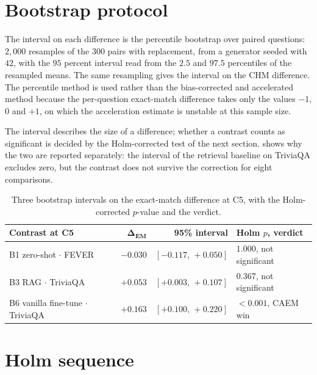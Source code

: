 \section{Bootstrap protocol}
\label{app:sig-bootstrap}

The interval on each difference is the percentile bootstrap over paired questions: $2{,}000$ resamples of the $300$ pairs with replacement, from a generator seeded with $42$, with the $95$ percent interval read from the $2.5$ and $97.5$ percentiles of the resampled means. The same resampling gives the interval on the CHM difference. The percentile method is used rather than the bias-corrected and accelerated method because the per-question exact-match difference takes only the values $-1$, $0$ and $+1$, on which the acceleration estimate is unstable at this sample size.

The interval describes the size of a difference; whether a contrast counts as significant is decided by the Holm-corrected test of the next section.  shows why the two are reported separately: the interval of the retrieval baseline on TriviaQA excludes zero, but the contrast does not survive the correction for eight comparisons.

\begin{table}[H]
\centering\small
\setlength{\tabcolsep}{6pt}
\begin{tabular}{@{}lrrl@{}}
\toprule
\textbf{Contrast at C5} & $\boldsymbol{\Delta_{\text{EM}}}$ & \textbf{95\% interval} & \textbf{Holm $p$, verdict} \\
\midrule
B1 zero-shot $\cdot$ FEVER & $-0.030$ & $[-0.117,\, +0.050]$ & $1.000$, not significant \\
B3 RAG $\cdot$ TriviaQA & $+0.053$ & $[+0.003,\, +0.107]$ & $0.367$, not significant \\
B6 vanilla fine-tune $\cdot$ TriviaQA & $+0.163$ & $[+0.100,\, +0.220]$ & $<0.001$, CAEM win \\
\bottomrule
\end{tabular}
\caption[Three bootstrap intervals at C5.]{Three bootstrap intervals on the exact-match difference at C5, with the Holm-corrected $p$-value and the verdict.}
\label{tab:app-sig-boot-intervals}
\end{table}

\section{Holm sequence}
\label{app:sig-holm}

